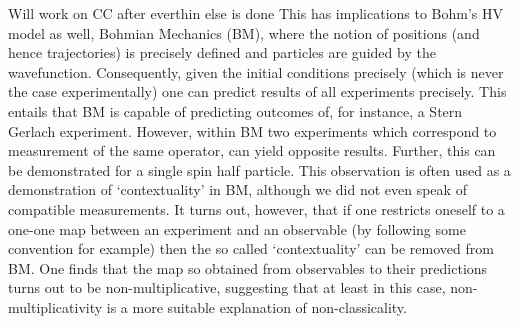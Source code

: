 \documentclass[british,aps,prl,superscriptaddress,nofootinbib,times,reprint]{revtex4-1}
\theoremstyle{plain}
\theoremstyle{plain}
\theoremstyle{definition}
\theoremstyle{remark}
\theoremstyle{remark}
\theoremstyle{remark}
\theoremstyle{plain}
\theoremstyle{plain}
\theoremstyle{plain}
\theoremstyle{definition}
\theoremstyle{definition}
\begin{document}
{\color{red} Will work on CC after everthin else
is done}
This has implications to Bohm's HV model as well, Bohmian Mechanics (BM), where the notion of positions (and hence trajectories) is precisely defined and particles are guided by the wavefunction. Consequently, given the initial conditions precisely (which is never the case experimentally) one can predict results of all experiments precisely. This entails that BM is capable of predicting outcomes of, for instance, a Stern Gerlach experiment. However, within BM two experiments which correspond to measurement of the same operator, can yield opposite results. Further, this can be demonstrated for a single spin half particle. This observation is often used as a demonstration of `contextuality' in BM, although we did not even speak of compatible measurements. It turns out, however, that if one restricts oneself to a one-one map between an experiment and an observable (by following some convention for example) then the so called `contextuality' can be removed from BM. One finds that the map so obtained from observables to their predictions turns out to be non-multiplicative, suggesting that at least in this case, non-multiplicativity is a more suitable explanation of non-classicality.
\end{document}

